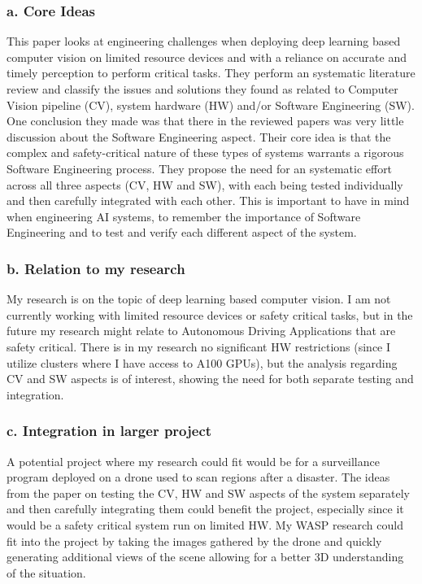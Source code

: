\documentclass[11pt]{article}
\begin{document}
\subsubsection*{a. Core Ideas}
This paper looks at engineering challenges when deploying deep learning based computer vision on limited resource devices and with a reliance on accurate and timely perception to perform critical tasks. They perform an systematic literature review and classify the issues and solutions they found as related to Computer Vision pipeline (CV), system hardware (HW) and/or Software Engineering (SW). One conclusion they made was that there in the reviewed papers was very little discussion about the Software Engineering aspect. Their core idea is that the complex and safety-critical nature of these types of systems warrants a rigorous Software Engineering process. They propose the need for an systematic effort across all three aspects (CV, HW and SW), with each being tested individually and then carefully integrated with each other. This is important to have in mind when engineering AI systems, to remember the importance of Software Engineering and to test and verify each different aspect of the system.
\subsubsection*{b. Relation to my research}
My research is on the topic of deep learning based computer vision. I am not currently working with limited resource devices or safety critical tasks, but in the future my research might relate to Autonomous Driving Applications that are safety critical. There is in my research no significant HW restrictions (since I utilize clusters where I have access to A100 GPUs), but the analysis regarding CV and SW aspects is of interest, showing the need for both separate testing and integration.
\subsubsection*{c. Integration in larger project}
A potential project where my research could fit would be for a surveillance program deployed on a drone used to scan regions after a disaster. The ideas from the paper on testing the CV, HW and SW aspects of the system separately and then carefully integrating them could benefit the project, especially since it would be a safety critical system run on limited HW. My WASP research could fit into the project by taking the images gathered by the drone and quickly generating additional views of the scene allowing for a better 3D understanding of the situation. 
\end{document}
